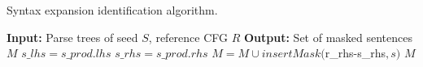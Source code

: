 \begin{algorithm}[t]
\caption{Syntax expansion identification algorithm.}
\label{alg:diff}
\begin{algorithmic}[1]
\STATE \textbf{Input:} Parse trees of seed \sents $S$, reference CFG $R$
\STATE \textbf{Output:} Set of masked sentences $M$
        \STATE $s\_lhs = s\_prod.lhs$
        \STATE $s\_rhs = s\_prod.rhs$
                \STATE $M = M \cup insertMask($r\_rhs-s\_rhs$, s)$
            \ENDIF
        \ENDFOR
    \ENDFOR
\ENDFOR
\RETURN $M$
\end{algorithmic}
\end{algorithm}
